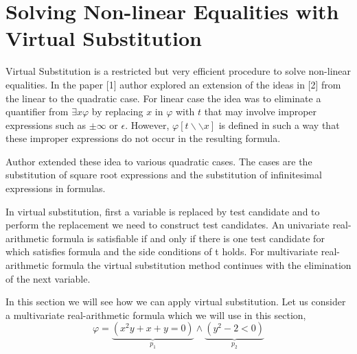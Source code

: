 \section{Solving Non-linear Equalities with Virtual Substitution}
\label{sec:solving non-linear equalities with virtual substitution}
Virtual Substitution is a restricted but very efficient procedure to solve non-linear equalities. In the paper [1] author explored an extension of the ideas in [2] from the linear to the quadratic case. For linear case the idea was to eliminate a quantifier from $\exists x \varphi$ by replacing $x$ in $\varphi$ with $t$ that may involve improper expressions such as $\pm \infty$ or $\epsilon$. However, $\varphi [t\backslash\backslash x]$ is defined in such a way that these improper expressions do not occur in the resulting formula.

Author extended these idea to various quadratic cases. The cases are the substitution of square root expressions and the substitution of infinitesimal expressions in formulas.

In virtual substitution, first a variable is replaced by test candidate and to perform the replacement we need to construct test candidates. An univariate real-arithmetic formula is satisfiable if and only if there is one test candidate for which satisfies formula and the side conditions of t holds. For multivariate real-arithmetic formula the virtual substitution method continues with the elimination of the next variable.

In this section we will see how we can apply virtual substitution. Let us consider a multivariate real-arithmetic formula which we will use in this section,
$$ \varphi = \underbrace{(x^{2}y + x + y = 0)}\limits_{p_{1}} \wedge \underbrace{(y^{2} -2 < 0)}\limits_{p_{2}}$$
